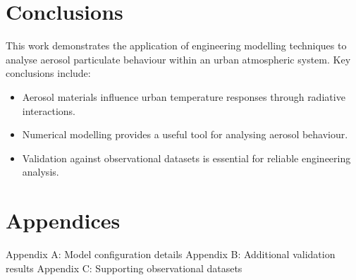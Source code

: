 \documentclass[12pt]{article}
\begin{document}
\section{Conclusions}
This work demonstrates the application of engineering modelling techniques to analyse aerosol particulate behaviour within an urban atmospheric system.
Key conclusions include:
\begin{itemize}
\item Aerosol materials influence urban temperature responses through radiative interactions.
\item Numerical modelling provides a useful tool for analysing aerosol behaviour.
\item Validation against observational datasets is essential for reliable engineering analysis.
\end{itemize}
\section*{Appendices}
Appendix A: Model configuration details
Appendix B: Additional validation results
Appendix C: Supporting observational datasets
\end{document}
